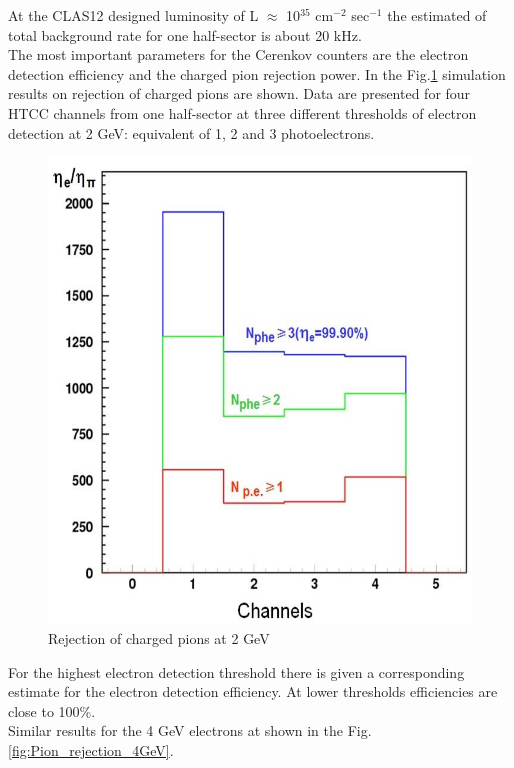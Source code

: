 At the CLAS12 designed luminosity of L $\approx$ 10$^{35}$ cm$^{-2}$ sec$^{-1}$ the estimated of total background rate for one half-sector is about 20 kHz. \\  
\indent The most important parameters for the Cerenkov counters are the electron detection efficiency and the charged pion rejection power. In the Fig.\ref{fig:Pion_rejection_2GeV} simulation results on rejection of charged pions are shown. Data are presented for four HTCC channels from one half-sector at three different thresholds of electron detection at 2 GeV: equivalent of 1, 2 and 3 photoelectrons. 

\begin{figure}[!ht]
    \centering
    \includegraphics[width=1.0\linewidth,trim={0.0cm 0.0cm 0.0cm 0.0cm},clip]{images/Pion_rejection_2GeV.jpg}
    \caption{Rejection of charged pions at 2 GeV}
    \label{fig:Pion_rejection_2GeV}
\end{figure}

For the highest electron detection threshold there is given a corresponding estimate for the electron detection efficiency. At lower thresholds efficiencies are close to 100\%. \\
\indent Similar results for the 4 GeV electrons at shown in the Fig.\ref{fig:Pion_rejection_4GeV}. 

